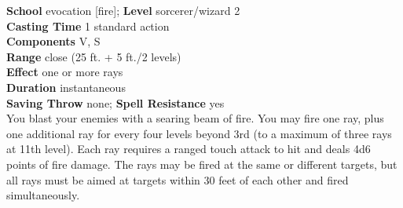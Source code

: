 \textbf{School} evocation [fire]; \textbf{Level} sorcerer/wizard 2\\
\textbf{Casting Time} 1 standard action\\
\textbf{Components} V, S\\
\textbf{Range} close (25 ft. + 5 ft./2 levels)\\
\textbf{Effect} one or more rays\\
\textbf{Duration} instantaneous\\
\textbf{Saving Throw} none; \textbf{Spell Resistance} yes\\
You blast your enemies with a searing beam of fire. You may fire one ray, plus one additional ray for every four levels beyond 3rd (to a maximum of three rays at 11th level). Each ray requires a ranged touch attack to hit and deals 4d6 points of fire damage. The rays may be fired at the same or different targets, but all rays must be aimed at targets within 30 feet of each other and fired simultaneously.\\
